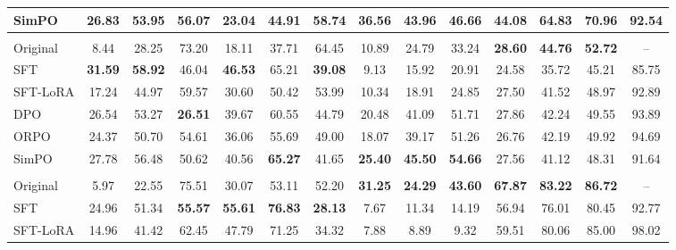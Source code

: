 \begin{table*}[!t]
\begin{minipage}[t]{\linewidth}
\begin{tabular}{l|ccc|ccc|ccc|cccc}
        SimPO & \cellcolor{lightblue}\textbf{26.83} & \cellcolor{lightblue}\textbf{53.95} & 56.07 & 23.04 & 44.91 & 58.74 & \cellcolor{lightblue}\textbf{36.56} & 43.96 & 46.66 & 44.08 & 64.83 & 70.96 & 92.54\\
        \hline
        \multicolumn{13}{c}{\text{\textit{CodeLlama-7B-Instruct}}}\\
        \hline
        Original & 8.44 & 28.25 & 73.20 & 18.11 & 37.71 & 64.45 & 10.89 & 24.79 & 33.24 & \cellcolor{lightblue}\textbf{28.60} & \cellcolor{lightblue}\textbf{44.76} & \cellcolor{lightblue}\textbf{52.72} & --\\
        SFT & \cellcolor{lightblue}\textbf{31.59} & \cellcolor{lightblue}\textbf{58.92} & 46.04 & \cellcolor{lightblue}\textbf{46.53} & 65.21 & \cellcolor{lightblue}\textbf{39.08} & 9.13 & 15.92 & 20.91 & 24.58 & 35.72 & 45.21 & 85.75\\
        SFT-LoRA & 17.24 & 44.97 & 59.57 & 30.60 & 50.42 & 53.99 & 10.34 & 18.91 & 24.85 & 27.50 & 41.52 & 48.97 & 92.89\\
        DPO & 26.54 & 53.27 & \cellcolor{lightblue}\textbf{26.51} & 39.67 & 60.55 & 44.79 & 20.48 & 41.09 & 51.71 & 27.86 & 42.24 & 49.55 & 93.89\\
        ORPO & 24.37 & 50.70 & 54.61 & 36.06 & 55.69 & 49.00 & 18.07 & 39.17 & 51.26 & 26.76 & 42.19 & 49.92 & 94.69\\
        SimPO & 27.78 & 56.48 & 50.62 & 40.56 & \cellcolor{lightblue}\textbf{65.27} & 41.65 & \cellcolor{lightblue}\textbf{25.40} & \cellcolor{lightblue}\textbf{45.50} & \cellcolor{lightblue}\textbf{54.66} & 27.56 & 41.12 & 48.31 & 91.64\\
        \hline
        \multicolumn{13}{c}{\text{\textit{DeepSeek-Coder-6.7B-Instruct}}}\\
        \hline
        Original & 5.97 & 22.55 & 75.51 & 30.07 & 53.11 & 52.20 & \cellcolor{lightblue}\textbf{31.25} & \cellcolor{lightblue}\textbf{24.29} & \cellcolor{lightblue}\textbf{43.60} & \cellcolor{lightblue}\textbf{67.87} & \cellcolor{lightblue}\textbf{83.22} & \cellcolor{lightblue}\textbf{86.72}  & --\\
        SFT & 24.96 & 51.34 & \textbf{55.57} & \cellcolor{lightblue}\textbf{55.61} & \cellcolor{lightblue}\textbf{76.83} & \cellcolor{lightblue}\textbf{28.13} & 7.67 & 11.34 & 14.19 & 56.94 & 76.01 & 80.45 & 92.77\\
        SFT-LoRA & 14.96 & 41.42 & 62.45 & 47.79 & 71.25 & 34.32 & 7.88 & 8.89 & 9.32 & 59.51 & 80.06 & 85.00 & 98.02\\

\end{tabular}
\end{minipage}
\end{table*}
